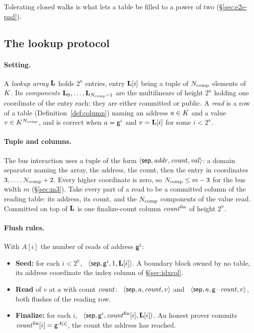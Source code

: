 Tolerating closed walks is what lets a table be filled to a power of two (\S\ref{sec:e2e-pad}).

\subsection{The lookup protocol}\label{sec:lookup}

\paragraph{Setting.} A \emph{lookup array} $\mathbf{L}$ holds $2^{\kappa}$ entries, entry $\mathbf{L}[i]$ being a tuple of $N_{\mathrm{comp}}$ elements of $K$. Its \emph{components} $\mathbf{L}_0,\dots,\mathbf{L}_{N_{\mathrm{comp}}-1}$ are the multilinears of height $2^{\kappa}$ holding one coordinate of the entry each: they are either committed or public. A \emph{read} is a row of a table (Definition~\ref{def:column}) naming an address $a\in K$ and a value $v\in K^{N_{\mathrm{comp}}}$, and is correct when $a=\mathsf{g}^{i}$ and $v=\mathbf{L}[i]$ for some $i<2^{\kappa}$.

\paragraph{Tuple and columns.} The bus interaction uses a tuple of the form $\langle \mathsf{sep},\mathit{addr},\mathit{count},\mathit{val} \rangle$: a domain separator naming the array, the address, the count, then the entry in coordinates $3,\dots,N_{\mathrm{comp}}+2$. Every higher coordinate is zero, so $N_{\mathrm{comp}}\le m-3$ for the bus width $m$ (\S\ref{sec:m3}). Take every part of a read to be a committed column of the reading table: its address, its count, and the $N_{\mathrm{comp}}$ components of the value read. Committed on top of $\mathbf{L}$ is one finalize-count column $\mathit{count}^{\mathrm{fin}}$ of height $2^{\kappa}$.

\paragraph{Flush rules.} With $A[i]$ the number of reads of address $\mathsf{g}^{i}$:
\begin{itemize}
\item \textbf{Seed:} for each $i<2^{\kappa}$, \push\ $\langle \mathsf{sep},\mathsf{g}^{i},1,\mathbf{L}[i] \rangle$. A boundary block owned by no table, its address coordinate the index column of \S\ref{sec:idxcol}.
\item \textbf{Read} of $v$ at $a$ with count $\mathit{count}$: \pull\ $\langle \mathsf{sep},a,\mathit{count},v \rangle$ and \push\ $\langle \mathsf{sep},a,\mathsf{g}\cdot\mathit{count},v \rangle$, both flushes of the reading row.
\item \textbf{Finalize:} for each $i$, \pull\ $\langle \mathsf{sep},\mathsf{g}^{i},\mathit{count}^{\mathrm{fin}}[i],\mathbf{L}[i] \rangle$. An honest prover commits $\mathit{count}^{\mathrm{fin}}[i]=\mathsf{g}^{A[i]}$, the count the address has reached.
\end{itemize}

